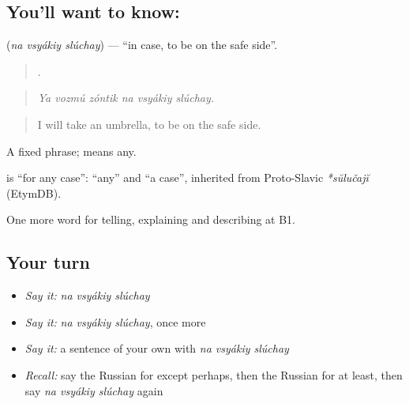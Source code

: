 \subsection*{You'll want to know:   }
\textbf{  } (\emph{na vsyákiy slúchay}) — \textquotedblleft{}in case, to be on the safe side\textquotedblright{}.

\begin{quote}
     .
\end{quote}

\begin{quote}
\emph{Ya vozmú zóntik na vsyákiy slúchay.}
\end{quote}

\begin{quote}
I will take an umbrella, to be on the safe side.
\end{quote}

A fixed phrase; \emph{} means any.

\begin{cousinweb}
\textbf{  } is \textquotedblleft{}for any case\textquotedblright{}: \emph{} \textquotedblleft{}any\textquotedblright{} and \emph{} \textquotedblleft{}a case\textquotedblright{}, inherited from Proto-Slavic \emph{*sŭlučajĭ} (EtymDB).
\end{cousinweb}

\begin{grammarlens}[title={What you've built}]
One more word for telling, explaining and describing at B1.
\end{grammarlens}

\subsection*{Your turn}
\begin{itemize}
\raggedright
  \item \emph{Say it:} \emph{na vsyákiy slúchay}
  \item \emph{Say it:} \emph{na vsyákiy slúchay}, once more
  \item \emph{Say it:} a sentence of your own with \emph{na vsyákiy slúchay}
  \item \emph{Recall:} say the Russian for except perhaps, then the Russian for at least, then say \emph{na vsyákiy slúchay} again
\end{itemize}

